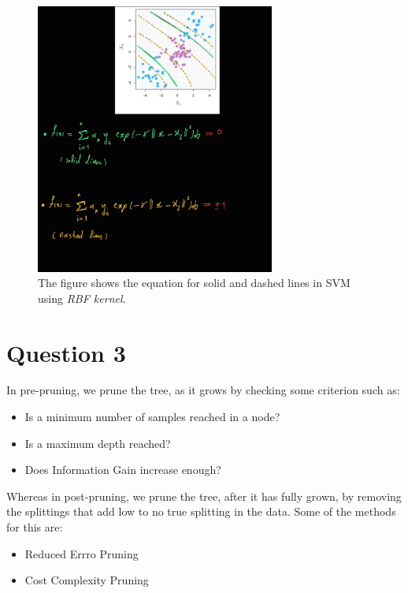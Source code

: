 \documentclass[a4paper,12pt]{article}
\begin{document}
\begin{enumerate}[label=(\alph*)]
\begin{figure}[H]
        \includegraphics[width=0.7\textwidth]{../images/q2c.jpg}
        \caption{The figure shows the equation for solid and dashed lines in SVM using \textit{RBF kernel}.}
        \label{fig:fig_2}
    \end{figure}
\end{enumerate}

\section*{Question 3}
In pre-pruning, we prune the tree, as it grows by checking some criterion such as:
\begin{itemize}
    \item Is a minimum number of samples reached in a node?
    \item Is a maximum depth reached?
    \item Does Information Gain increase enough? 
\end{itemize}

Whereas in post-pruning, we prune the tree, after it has fully grown, by removing the splittings that add low to no true splitting in the data. Some of the methods for this are:
\begin{itemize}
    \item Reduced Errro Pruning
    \item Cost Complexity Pruning
\end{itemize}

\begin{table}[ht!]
\centering
{}
\caption{Comparison of Pre-Pruning and Post-Pruning}
\end{table}
\end{document}
